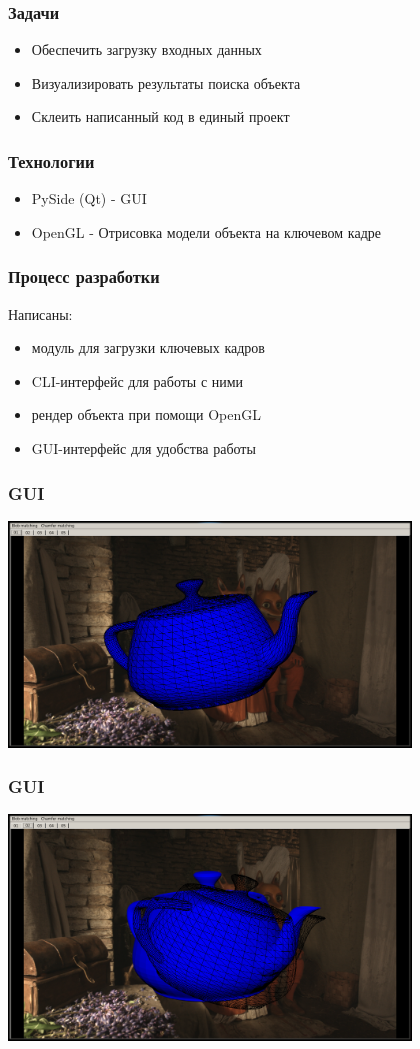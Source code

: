 \begin{frame}\frametitle{Задачи}
    \begin{itemize}
        \item Обеспечить загрузку входных данных
        \item Визуализировать результаты поиска объекта
        \item Склеить написанный код в единый проект
    \end{itemize}
\end{frame}

\begin{frame}\frametitle{Технологии}
    \begin{itemize}
        \item PySide (Qt) - GUI
        \item OpenGL      - Отрисовка модели объекта на ключевом кадре
    \end{itemize}
\end{frame}

\begin{frame}\frametitle{Процесс разработки}
    Написаны:
    \begin{itemize}
        \item модуль для загрузки ключевых кадров
        \item CLI-интерфейс для работы с ними
        \item рендер объекта при помощи OpenGL
        \item GUI-интерфейс для удобства работы
    \end{itemize}
\end{frame}

\begin{frame}\frametitle{GUI}
    \includegraphics[height=6cm]{gui_samples/sample_01.png}
\end{frame}

\begin{frame}\frametitle{GUI}
    \includegraphics[height=6cm]{gui_samples/sample_02.png}
\end{frame}

